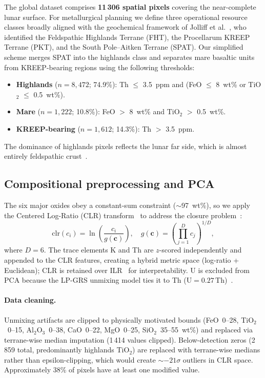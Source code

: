 \documentclass[11pt,a4paper]{article}
\begin{document}
The global dataset comprises \textbf{11\,306 spatial pixels} covering the near-complete lunar surface. For metallurgical planning we define three operational resource classes broadly aligned with the geochemical framework of Jolliff et al.~\cite{Jolliff2000}, who identified the Feldspathic Highlands Terrane (FHT), the Procellarum KREEP Terrane (PKT), and the South Pole--Aitken Terrane (SPAT). Our simplified scheme merges SPAT into the highlands class and separates mare basaltic units from KREEP-bearing regions using the following thresholds:
\begin{itemize}[leftmargin=1.4em]
  \item \textbf{Highlands} ($n = 8{,}472$; 74.9\%): Th $\leq$ 3.5~ppm and (FeO $\leq$ 8~wt\% or TiO$_2$ $\leq$ 0.5~wt\%).
  \item \textbf{Mare} ($n = 1{,}222$; 10.8\%): FeO $>$ 8~wt\% and TiO$_2$ $>$ 0.5~wt\%.
  \item \textbf{KREEP-bearing} ($n = 1{,}612$; 14.3\%): Th $>$ 3.5~ppm.
\end{itemize}

The dominance of highlands pixels reflects the lunar far side, which is almost entirely feldspathic crust~\cite{Taylor2009}.

\subsection{Compositional preprocessing and PCA}

The six major oxides obey a constant-sum constraint ($\sim$97~wt\%), so we apply the Centered Log-Ratio (CLR) transform~\cite{Aitchison1986} to address the closure problem~\cite{PawlowskyGlahn2011}:
\begin{equation}
\mathrm{clr}(c_i) = \ln\!\left(\frac{c_i}{g(\mathbf{c})}\right), \quad
g(\mathbf{c}) = \left(\prod_{j=1}^{D} c_j\right)^{\!1/D},
\end{equation}
where $D = 6$. The trace elements K and Th are $z$-scored independently and appended to the CLR features, creating a hybrid metric space (log-ratio + Euclidean); CLR is retained over ILR~\cite{Filzmoser2009} for interpretability. U is excluded from PCA because the LP-GRS unmixing model ties it to Th ($\text{U} = 0.27\,\text{Th}$)~\cite{Prettyman2006}.

\paragraph{Data cleaning.}
Unmixing artifacts are clipped to physically motivated bounds (FeO~0--28, TiO$_2$~0--15, Al$_2$O$_3$~0--38, CaO~0--22, MgO~0--25, SiO$_2$~35--55~wt\%) and replaced via terrane-wise median imputation (1\,414 values clipped). Below-detection zeros (2\,859 total, predominantly highlands TiO$_2$) are replaced with terrane-wise medians rather than epsilon-clipping, which would create ${\sim}{-21}\sigma$ outliers in CLR space. Approximately 38\% of pixels have at least one modified value.
\end{document}
